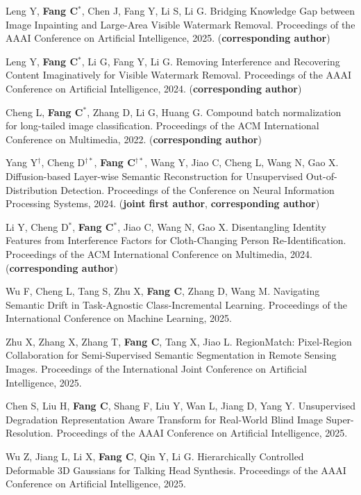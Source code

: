 \documentclass[a4paper,36pt]{article}
\newcommand{\tb}[1]{\textbf{#1}}
\newcommand{\resumeItemWithoutTitle}[1]{
  \item\justifying\small{
    {#1 \vspace{-2pt}}
  }
}
\begin{document}
\resumeItemWithoutTitle{Leng Y, \tb{Fang C}$^{\ast}$, Chen J, Fang Y, Li S, Li G. Bridging Knowledge Gap between Image Inpainting and Large-Area Visible Watermark Removal. Proceedings of the AAAI Conference on Artificial Intelligence, 2025. (\tb{corresponding author})}

\resumeItemWithoutTitle{Leng Y, \tb{Fang C}$^{\ast}$, Li G, Fang Y, Li G. Removing Interference and Recovering Content Imaginatively for Visible Watermark Removal. Proceedings of the AAAI Conference on Artificial Intelligence, 2024. (\tb{corresponding author})}

\resumeItemWithoutTitle{Cheng L, \tb{Fang C}$^{\ast}$, Zhang D, Li G, Huang G. Compound batch normalization for long-tailed image classification. Proceedings of the ACM International Conference on Multimedia, 2022. (\tb{corresponding author})}

\resumeItemWithoutTitle{Yang Y$^{\dag}$, Cheng D$^{\dag\ast}$, \tb{Fang C}$^{\dag\ast}$, Wang Y, Jiao C, Cheng L, Wang N, Gao X. Diffusion-based Layer-wise Semantic Reconstruction for Unsupervised Out-of-Distribution Detection. Proceedings of the Conference on Neural Information Processing Systems, 2024. (\tb{joint first author}, \tb{corresponding author})}

\resumeItemWithoutTitle{Li Y, Cheng D$^{\ast}$, \tb{Fang C}$^{\ast}$, Jiao C, Wang N, Gao X. Disentangling Identity Features from Interference Factors for Cloth-Changing Person Re-Identification. Proceedings of the ACM International Conference on Multimedia, 2024. (\tb{corresponding author})}

\resumeItemWithoutTitle{Wu F, Cheng L, Tang S, Zhu X, \tb{Fang C}, Zhang D, Wang M. Navigating Semantic Drift in Task-Agnostic Class-Incremental Learning. Proceedings of the International Conference on Machine Learning, 2025.}

\resumeItemWithoutTitle{Zhu X, Zhang X, Zhang T, \tb{Fang C}, Tang X, Jiao L. RegionMatch: Pixel-Region Collaboration for Semi-Supervised Semantic Segmentation in Remote Sensing Images. Proceedings of the International Joint Conference on Artificial Intelligence, 2025.}

\resumeItemWithoutTitle{Chen S, Liu H, \tb{Fang C}, Shang F, Liu Y, Wan L, Jiang D, Yang Y. Unsupervised Degradation Representation Aware Transform for Real-World Blind Image Super-Resolution. Proceedings of the AAAI Conference on Artificial Intelligence, 2025.}

\resumeItemWithoutTitle{Wu Z, Jiang L, Li X, \tb{Fang C}, Qin Y, Li G. Hierarchically Controlled Deformable 3D Gaussians for Talking Head Synthesis. Proceedings of the AAAI Conference on Artificial Intelligence, 2025.}
\end{document}
